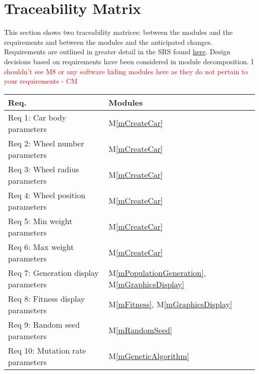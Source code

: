 \documentclass[12pt, titlepage]{article}
\newcommand{\mref}[1]{M\ref{#1}}
\begin{document}
\section{Traceability Matrix} \label{SecTM}

This section shows two traceability matrices: between the modules and the
requirements and between the modules and the anticipated changes. Requirements 
are outlined in greater detail in the SRS found 
\href{https://gitlab.cas.mcmaster.ca/linkk4/GrateBox/tree/master/Doc/SRS}{here}. Design decisions based on requirements have been considered in module decomposition.
\textcolor{red}{I shouldn't see M8 or any software hiding modules here as they do not pertain to your requirements - CM} \\
\begin{table}[H]
\centering
\begin{tabular}{p{} p{}}
\toprule
\textbf{Req.} & \textbf{Modules}\\
\midrule
Req 1: Car body parameters & \mref{mCreateCar}\\
Req 2: Wheel number parameters & \mref{mCreateCar}\\
Req 3: Wheel radius parameters & \mref{mCreateCar}\\
Req 4: Wheel position parameters & \mref{mCreateCar}\\
Req 5: Min weight parameters & \mref{mCreateCar}\\
Req 6: Max weight parameters & \mref{mCreateCar}\\
Req 7: Generation display parameters & \mref{mPopulationGeneration}, 
\mref{mGraphicsDisplay}\\
Req 8: Fitness display parameters & \mref{mFitness}, \mref{mGraphicsDisplay}\\
Req 9: Random seed parameters & \mref{mRandomSeed}\\
Req 10: Mutation rate parameters & \mref{mGeneticAlgorithm}\\
\bottomrule
\end{tabular}
\label{TblRT}
\end{table}
\end{document}
